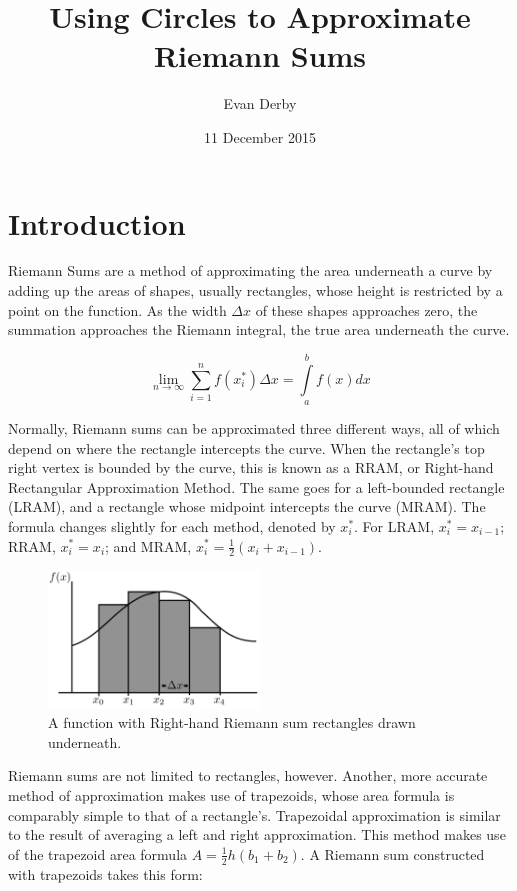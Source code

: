 \documentclass{article}
\begin{document}
  \title{Using Circles to Approximate Riemann Sums}
  \author{Evan Derby}
  \date{11 December 2015}
  \maketitle

  \section{Introduction}
    Riemann Sums are a method of approximating the area underneath a curve by adding up the areas of shapes, usually rectangles, whose height is restricted by a point on the function. As the width \( \Delta x \) of these shapes approaches zero, the summation approaches the Riemann integral, the true area underneath the curve.

    \[ \displaystyle\lim_{n \to \infty}\sum_{i=1}^{n} f(x^*_i) \Delta x = \int\limits_a^b f(x)dx \]

    Normally, Riemann sums can be approximated three different ways, all of which depend on where the rectangle intercepts the curve. When the rectangle's top right vertex is bounded by the curve, this is known as a RRAM, or Right-hand Rectangular Approximation Method. The same goes for a left-bounded rectangle (LRAM), and a rectangle whose midpoint intercepts the curve (MRAM). The formula changes slightly for each method, denoted by \( x^*_i \). For LRAM, \( x_i^* = x_{i-1} \); RRAM, \( x_i^* = x_i \); and MRAM, \( x_i^* = \frac{1}{2}(x_i + x_{i-1}) \).

    \begin{figure}[h]
      \centering
      \includegraphics[width=0.5\textwidth]{riemann_1}
      \caption{A function with Right-hand Riemann sum rectangles drawn underneath.}
    \end{figure}

    Riemann sums are not limited to rectangles, however. Another, more accurate method of approximation makes use of trapezoids, whose area formula is comparably simple to that of a rectangle's. Trapezoidal approximation is similar to the result of averaging a left and right approximation. This method makes use of the trapezoid area formula \( A = \frac{1}{2}h(b_1+b_2) \). A Riemann sum constructed with trapezoids takes this form:
\end{document}
